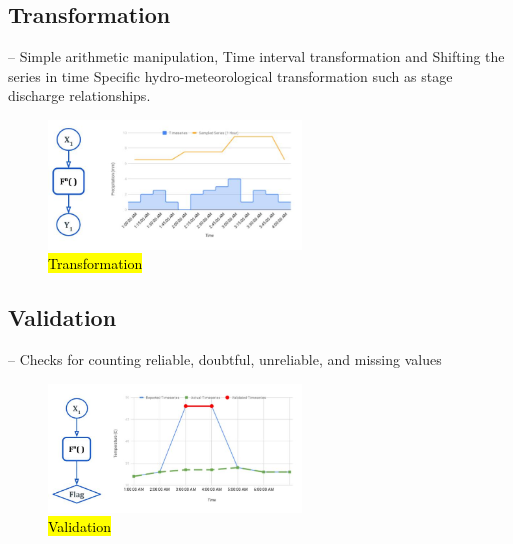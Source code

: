 \subsection{Transformation}-- Simple arithmetic manipulation, Time interval transformation and Shifting the series in time Specific hydro-meteorological transformation such as stage discharge relationships.
\begin{figure}[htp]
    \centering
    \includegraphics[width=0.6\textwidth]{method/data_preprocess/transformation.jpg}
    \caption{\hl{Transformation}}
    \label{fi:transformation}
\end{figure}

\subsection{Validation}-- Checks for counting reliable, doubtful, unreliable, and missing values
\begin{figure}[htp]
    \centering
    \includegraphics[width=0.6\textwidth]{method/data_preprocess/validation.jpg}
    \caption{\hl{Validation}}
    \label{fi:validation}
\end{figure}

